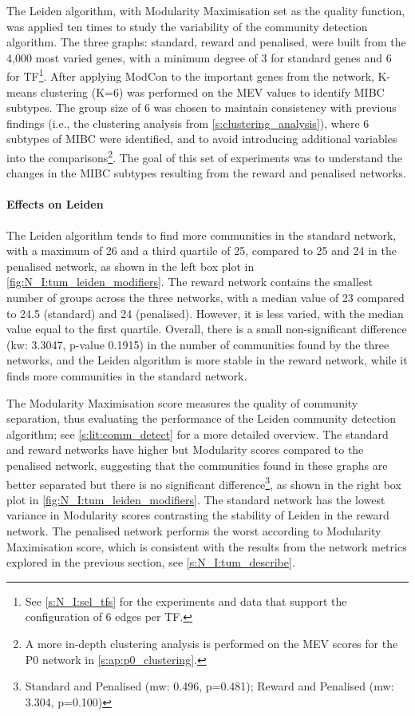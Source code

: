 The Leiden algorithm, with Modularity Maximisation set as the quality function, was applied ten times to study the variability of the community detection algorithm. The three graphs: standard, reward and penalised, were built from the 4,000 most varied genes, with a minimum degree of 3 for standard genes and 6 for TF\footnote{See \cref{s:N_I:sel_tfs} for the experiments and data that support the configuration of 6 edges per TF.}. After applying ModCon to the important genes from the network, K-means clustering (K=6) was performed on the MEV values to identify MIBC subtypes. The group size of 6 was chosen to maintain consistency with previous findings (i.e., the clustering analysis from \cref{s:clustering_analysis}), where 6 subtypes of MIBC were identified, and to avoid introducing additional variables into the comparisons\footnote{A more in-depth clustering analysis is performed on the MEV scores for the P0 network in \cref{s:ap:p0_clustering}.}. The goal of this set of experiments was to understand the changes in the MIBC subtypes resulting from the reward and penalised networks.


\paragraph*{Effects on Leiden}


The Leiden algorithm tends to find more communities in the standard network, with a maximum of 26 and a third quartile of 25, compared to 25 and 24 in the penalised network, as shown in the left box plot in \cref{fig:N_I:tum_leiden_modifiers}. The reward network contains the smallest number of groups across the three networks, with a median value of 23 compared to 24.5 (standard) and 24 (penalised). However, it is less varied, with the median value equal to the first quartile. Overall, there is a small non-significant difference (\acrshort{kw}:  3.3047, p-value 0.1915) in the number of communities found by the three networks, and the Leiden algorithm is more stable in the reward network, while it finds more communities in the standard network.

The Modularity Maximisation score measures the quality of community separation, thus evaluating the performance of the Leiden community detection algorithm; see \cref{s:lit:comm_detect} for a more detailed overview. The standard and reward networks have higher but Modularity scores compared to the penalised network, suggesting that the communities found in these graphs are better separated but there is no significant difference\footnote{Standard and Penalised (\acrshort{mw}: 0.496, p=0.481); Reward and Penalised  (\acrshort{mw}: 3.304, p=0.100)}, as shown in the right box plot in \cref{fig:N_I:tum_leiden_modifiers}. The standard network has the lowest variance in Modularity scores contrasting the stability of Leiden in the reward network. The penalised network performs the worst according to Modularity Maximisation score, which is consistent with the results from the network metrics explored in the previous section, see \cref{s:N_I:tum_describe}.

